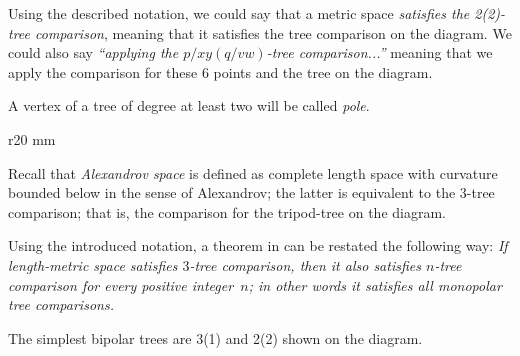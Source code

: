 Using the described notation, we could say that a metric space \emph{satisfies the 2(2)-tree comparison},  meaning that it satisfies the tree comparison on the diagram.
We could also say \emph{``applying the $p/xy(q/vw)$-tree comparison...''} meaning that we apply the comparison for these 6 points and the tree on the diagram.

A vertex of a tree of degree at least two will be called \emph{pole}.

\hide
\begin{wrapfigure}{r}{20 mm}
\end{wrapfigure}
\unhide

Recall that \emph{Alexandrov space} is defined as complete length space with curvature bounded below in the sense of Alexandrov;
the latter is equivalent to the 3-tree comparison; that is, the comparison for the tripod-tree on the diagram. 

Using the introduced notation, a theorem in \cite{AKP} can be restated the following way: \emph{If length-metric space satisfies $3$-tree comparison, then it also satisfies $n$-tree comparison for every positive integer~$n$; in other words it satisfies all monopolar tree comparisons.}

The simplest bipolar trees  are 3(1) and 2(2) shown on the diagram.

